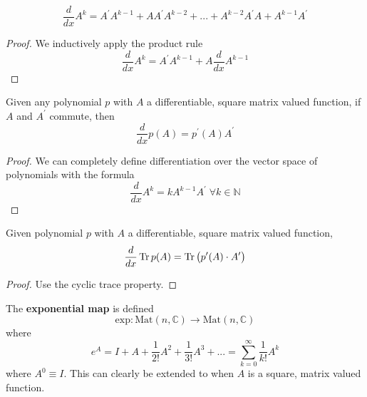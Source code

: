   \begin{proposition}
    \begin{equation}
      \frac{d}{d x} A^k = A^\prime A^{k-1} + A A^\prime A^{k-2} + ... + A^{k-2} A^\prime A + A^{k-1} A^\prime
    \end{equation}
  \end{proposition}
  \begin{proof}
    We inductively apply the product rule
    \begin{equation}
      \frac{d}{d x} A^k = A^\prime A^{k-1} + A \frac{d}{d x} A^{k-1}
    \end{equation}
  \end{proof}

  \begin{corollary}
    Given any polynomial $p$ with $A$ a differentiable, square matrix valued function, if $A$ and $A^\prime$ commute, then 
    \begin{equation}
      \frac{d}{d x} p(A) = p^\prime (A) A^\prime
    \end{equation}
  \end{corollary}
  \begin{proof}
    We can completely define differentiation over the vector space of polynomials with the formula
    \begin{equation}
      \frac{d}{d x} A^k = k A^{k-1} A^\prime \; \forall k \in \mathbb{N}
    \end{equation}
  \end{proof}

  \begin{corollary}
    Given polynomial $p$ with $A$ a differentiable, square matrix valued function, 
    \begin{equation}
      \frac{d}{d x} \Tr{p(A)} = \Tr{\big( p^\prime(A) \cdot A^\prime \big)}
    \end{equation}
  \end{corollary}
  \begin{proof}
    Use the cyclic trace property.
  \end{proof}

  \begin{definition}
    The \textbf{exponential map} is defined
    \begin{equation}
      \text{exp}: \text{Mat}(n, \mathbb{C}) \longrightarrow \text{Mat}(n, \mathbb{C})
    \end{equation}
    where 
    \begin{equation}
      e^A = I + A + \frac{1}{2!} A^2 + \frac{1}{3!} A^3 + ... = \sum_{k=0}^\infty \frac{1}{k!} A^k
    \end{equation}
    where $A^0 \equiv I$. This can clearly be extended to when $A$ is a square, matrix valued function. 
  \end{definition}

